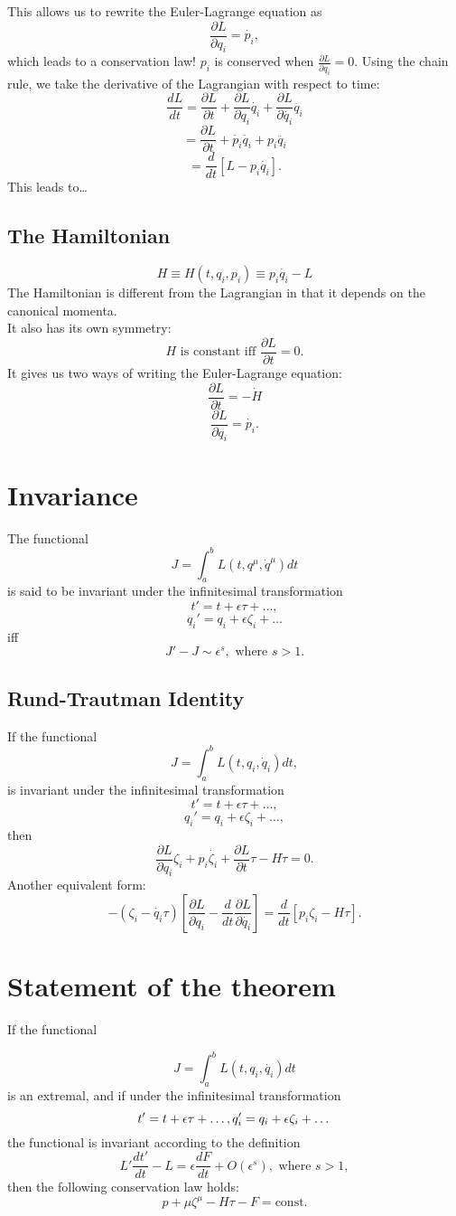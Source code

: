 \documentclass[11pt]{article}
\begin{document}
This allows us to rewrite the Euler-Lagrange equation as
$$\frac{\partial L}{\partial q_i}=\dot{p_i},$$
which leads to a conservation law!
$p_i$ is conserved when $\frac{\partial L}{\partial q_i}=0.$
Using the chain rule, we take the derivative of the Lagrangian with respect to time:
$$\frac{dL}{dt}=\frac{\partial L}{\partial t}+\frac{\partial L}{\partial q_i}\dot{q_i}+\frac{\partial L}{\partial \dot{q_i}}\ddot{q_i}$$
$$=\frac{\partial L}{\partial t}+\dot{p_i}\dot{q_i}+p_i\ddot{q_i}$$
$$=\frac{d}{dt}[L-p_i\dot{q_i}].$$
This leads to\dots

\subsection{The Hamiltonian}
$$H\equiv H(t,q_i,p_i)\equiv p_i \dot{q_i}-L$$
The Hamiltonian is different from the Lagrangian in that it depends on the canonical momenta.\\
It also has its own symmetry:
$$H \textrm{ is constant  iff } \frac{\partial L}{\partial t}=0.$$ 
It gives us two ways of writing the Euler-Lagrange equation:
$$\frac{\partial L}{\partial t}=-\dot{H}$$
$$\frac{\partial L}{\partial q_i}=\dot{p_i}.$$

\section{Invariance}
The functional 
$$J=\int_a^b L(t,q^\mu, \dot{q}^\mu)dt$$
is said to be invariant under the infinitesimal transformation
$$ t'=t+\epsilon \tau+\dots,$$
$$q_i'=q_i+\epsilon \zeta_i+\dots$$
iff
$$J'-J\sim \epsilon^s, \textrm{ where } s>1.$$
\subsection{Rund-Trautman Identity}
If the functional
$$J = \int_a^b L(t,q_i,\dot{q}_i)dt,$$
is invariant under the infinitesimal transformation
$$t'=t+\epsilon \tau+\dots,$$
$$q_i'=q_i+\epsilon\zeta_i+\dots,$$
then
$$\frac{\partial L}{\partial q_i}\zeta_i+p_i\dot{\zeta_i}+\frac{\partial L}{\partial t}\tau - H\dot{\tau}=0.$$
Another equivalent form:
$$-(\zeta_i-\dot{q_i}\tau)[\frac{\partial L}{\partial q_i}-\frac{d}{dt}\frac{\partial L}{\partial \dot{q_i}}]=\frac{d}{dt}[p_i\zeta_i-H\tau].$$
\section{Statement of the theorem}
If the functional

$$J=\int_a^b L(t,q_i, \dot{q_i})dt$$
is an extremal, and if under the infinitesimal transformation
$$t'=t+\epsilon\tau+\dots,\\
	q_i'=q_i+\epsilon\zeta_i+\dots
$$
the functional is invariant according to the definition
$$L'\frac{dt'}{dt}-L=\epsilon\frac{dF}{dt}+O(\epsilon^s), \textrm{ where } s>1,$$
then the following conservation law holds:
$$p+\mu\zeta^\mu-H\tau-F=\textrm{const.}$$
\end{document}
